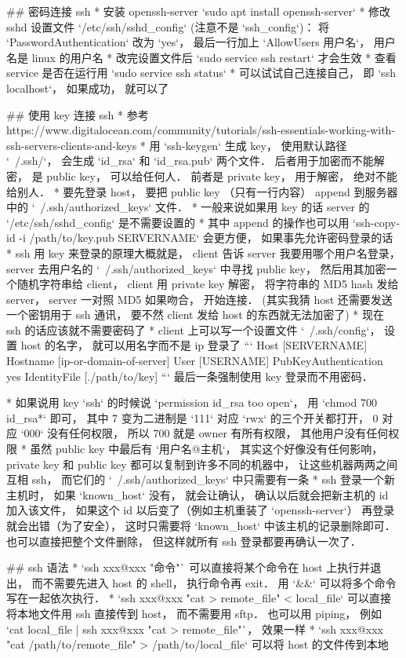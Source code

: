 
\begin{issues}
\issueDraft
\end{issues}

## 密码连接 ssh
* 安装 openssh-server `sudo apt install openssh-server`
* 修改 sshd 设置文件 `/etc/ssh/sshd_config` (注意不是 `ssh_config`)： 将 `PasswordAuthentication` 改为 `yes`， 最后一行加上 `AllowUsers 用户名`， 用户名是 linux 的用户名
* 改完设置文件后 `sudo service ssh restart` 才会生效
* 查看 service 是否在运行用  `sudo service ssh status`
* 可以试试自己连接自己， 即 `ssh localhost`， 如果成功， 就可以了

## 使用 key 连接 ssh
* 参考 https://www.digitalocean.com/community/tutorials/ssh-essentials-working-with-ssh-servers-clients-and-keys
* 用 `ssh-keygen` 生成 key， 使用默认路径 `~/.ssh/`， 会生成 `id_rsa` 和 `id_rsa.pub` 两个文件． 后者用于加密而不能解密， 是 public key， 可以给任何人． 前者是 private key， 用于解密， 绝对不能给别人．
* 要先登录 host， 要把 public key （只有一行内容） append 到服务器中的 `~/.ssh/authorized_keys` 文件．
* 一般来说如果用 key 的话 server 的 `/etc/ssh/sshd_config` 是不需要设置的
* 其中 append 的操作也可以用 `ssh-copy-id -i /path/to/key.pub SERVERNAME` 会更方便， 如果事先允许密码登录的话
* ssh 用 key 来登录的原理大概就是， client 告诉 server 我要用哪个用户名登录， server 去用户名的 `~/.ssh/authorized_keys` 中寻找 public key， 然后用其加密一个随机字符串给 client， client 用 private key 解密， 将字符串的 MD5 hash 发给 server， server 一对照 MD5 如果吻合， 开始连接．  (其实我猜 host 还需要发送一个密钥用于 ssh 通讯， 要不然 client 发给 host 的东西就无法加密了)
* 现在 ssh 的话应该就不需要密码了
* client 上可以写一个设置文件 `~/.ssh/config`， 设置 host 的名字， 就可以用名字而不是 ip 登录了
```
Host [SERVERNAME]
Hostname [ip-or-domain-of-server]
User [USERNAME]
PubKeyAuthentication yes
IdentityFile [./path/to/key]
```
最后一条强制使用 key 登录而不用密码．

* 如果说用 key `ssh` 的时候说 `permission id_rsa too open`， 用 `chmod 700 id_rsa*` 即可， 其中 7 变为二进制是 `111` 对应 `rwx` 的三个开关都打开， 0 对应 `000` 没有任何权限， 所以 700 就是 owner 有所有权限， 其他用户没有任何权限
* 虽然 public key 中最后有 `用户名@主机`， 其实这个好像没有任何影响， private key 和 public key 都可以复制到许多不同的机器中， 让这些机器两两之间互相 ssh， 而它们的 `~/.ssh/authorized_keys` 中只需要有一条
* ssh 登录一个新主机时， 如果 `known_host` 没有， 就会让确认， 确认以后就会把新主机的 id 加入该文件， 如果这个 id 以后变了（例如主机重装了 `openssh-server`） 再登录就会出错（为了安全）， 这时只需要将 `known_host` 中该主机的记录删除即可． 也可以直接把整个文件删除， 但这样就所有 ssh 登录都要再确认一次了．

## ssh 语法
* `ssh xxx@xxx "命令"` 可以直接将某个命令在 host 上执行并退出， 而不需要先进入 host 的 shell， 执行命令再 exit． 用 `&&` 可以将多个命令写在一起依次执行．
* `ssh xxx@xxx "cat > remote_file" < local_file` 可以直接将本地文件用 ssh 直接传到 host， 而不需要用 sftp． 也可以用 piping， 例如 `cat local_file | ssh xxx@xxx "cat > remote_file"`， 效果一样
* `ssh xxx@xxx "cat /path/to/remote_file" > /path/to/local_file` 可以将 host 的文件传到本地
